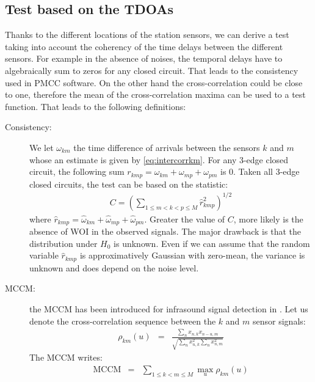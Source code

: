 \documentclass[graybox]{svmult/styles/svmult}
\def\hat{\widehat}
\def\mccm{\mathrm{MCCM}}
\begin{document}
  \subsection{Test based on the TDOAs}
Thanks to the different locations of the station sensors, we can derive a test taking into account the coherency of the time delays 
between the different sensors. For example in the absence of noises, the temporal delays have to algebraically sum to zeros for any closed circuit. That leads to the consistency used in PMCC software. On the other hand the cross-correlation could be close to one, therefore the mean of the cross-correlation maxima can be used to a test function. That leads to the following definitions:
\begin{description}
\item[Consistency:]
We let $\omega_{km}$ the time difference of arrivals between the sensors $k$ and $m$ whose an estimate is given by \eqref{eq:intercorrkm}. For any 3-edge closed  circuit, the following sum $r_{kmp}=\omega_{km}+\omega_{mp}+\omega_{pm}$ is $0$. Taken all 3-edge closed  circuits, the test can be based on the statistic:
\begin{eqnarray}
\label{eq-defconsistency}
C =\left( \sum_{1\leq m<k<p\leq M}\hat r^{2}_{kmp}\right)^{1/2}
\end{eqnarray}
where $\hat r_{kmp}=\hat\omega_{km}+\hat\omega_{mp}+\hat\omega_{pm}$.  Greater the value of $C$, more likely is the absence of WOI in the observed signals. The major drawback is that the distribution under $H_{0}$ is unknown. Even if we can assume that the random variable $\hat r_{kmp}$ is approximatively Gaussian with zero-mean, the variance is unknown and does depend on the noise level.



\item[MCCM:] the MCCM has been introduced for infrasound signal detection in \cite{wilson:2005bis}. Let us denote the cross-correlation sequence between the $k$ and $m$ sensor signals:
\begin{eqnarray*}
\rho_{km}(u)&=&\frac{\sum_{n} x_{n,k}x_{n-u,m}}{\sqrt{\sum_{n} x^{2}_{n,k}\sum_{n} x^{2}_{n,m}}}
\end{eqnarray*}
The MCCM writes:
\begin{eqnarray}
\label{eq:mccmdef}
\mccm&=&\sum_{1\leq k<m\leq M}\max_{u}\rho_{km}(u)
\end{eqnarray}


\end{description}
\end{document}

